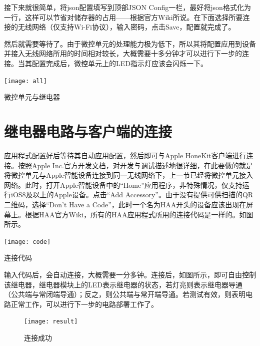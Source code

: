 \par 接下来就很简单，将json配置填写到顶部JSON Config一栏，最好将json格式化为一行，这样可以节省对储存器的占用——根据官方Wiki所说。在下面选择所要连接的无线网络（仅支持Wi-Fi协议），输入密码，点击Save，配置就完成了。

\par 然后就需要等待了。由于微控单元的处理能力极为低下，所以其将配置应用到设备并接入无线网络所用的时间相对较长，大概需要十多分钟才可以进行下一步的连接。当其配置完成后，微控单元上的LED指示灯应该会闪烁一下。

\begin{marginfigure}[0cm]
	\texttt{[image: all]}
	\caption[all]{微控单元与继电器}
\end{marginfigure}

\section{继电器电路与客户端的连接}

\setlength\parindent{2em} 应用程式配置好后等待其自动应用配置，然后即可与Apple HoneKit客户端进行连接。按照Apple Inc.官方开发文档，对开发与调试描述地很详细，在此要做的就是将微控单元与Apple智能设备连接到同一无线网络下，上一节已经将微控单元接入网络。此时，打开Apple智能设备中的“Home”应用程序，非特殊情况，仅支持运行iOS8及以上的Apple设备。点击“Add Accessory”。由于没有提供可供扫描的QR二维码，选择“Don't Have a Code”，此时一个名为HAA开头的设备应该出现在屏幕上。根据HAA官方Wiki，所有的HAA应用程式所用的连接代码是一样的。如图所示。

\begin{marginfigure}[0cm]
	\texttt{[image: code]}
	\caption[code]{连接代码}
\end{marginfigure}

\par 输入代码后，会自动连接，大概需要一分多钟。连接后，如图所示，即可自由控制该继电器，继电器模块上的LED表示继电器的状态，若灯亮则表示继电器导通（公共端与常闭端导通）；反之，则公共端与常开端导通。若测试有效，则表明电路正常工作，可以进行下一步的电路部署工作了。

\begin{figure}[h!]
	\texttt{[image: result]}
	\caption[result]{连接成功}
\end{figure}
